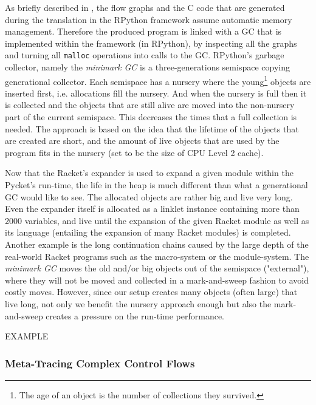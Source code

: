 As briefly described in , the flow graphs and
the C code that are generated during the translation in the RPython
framework assume automatic memory management. Therefore the produced
program is linked with a GC that is implemented within the framework
(in RPython), by inspecting all the graphs and turning all
\texttt{malloc} operations into calls to the GC. RPython's garbage
collector, namely the \emph{minimark GC} is a three-generations
semispace copying generational collector. Each semispace has a nursery
where the young\footnote{The age of an object is the number of
  collections they survived.}  objects are inserted first,
i.e. allocations fill the nursery. And when the nursery is full then
it is collected and the objects that are still alive are moved into
the non-nursery part of the current semispace. This decreases the
times that a full collection is needed. The approach is based on the
idea that the lifetime of the objects that are created are short, and
the amount of live objects that are used by the program fits in the
nursery (set to be the size of CPU Level 2 cache). \cite{pypy06,
  bolz:14, gc:16, gc:12}

Now that the Racket's expander is used to expand a given module within
the Pycket's run-time, the life in the heap is much different than
what a generational GC would like to see. The allocated objects are
rather big and live very long. Even the expander itself is allocated
as a linklet instance containing more than 2000 variables, and live
until the expansion of the given Racket module as well as its language
(entailing the expansion of many Racket modules) is completed. Another
example is the long continuation chains caused by the large depth of
the real-world Racket programs such as the macro-system or the
module-system. The \emph{minimark GC} moves the old and/or big objects
out of the semispace ("external"), where they will not be moved and
collected in a mark-and-sweep fashion to avoid costly moves. However,
since our setup creates many objects (often large) that live long, not
only we benefit the nursery approach enough but also the
mark-and-sweep creates a pressure on the run-time performance.

EXAMPLE

\newpage

\subsubsection{Meta-Tracing Complex Control Flows}

